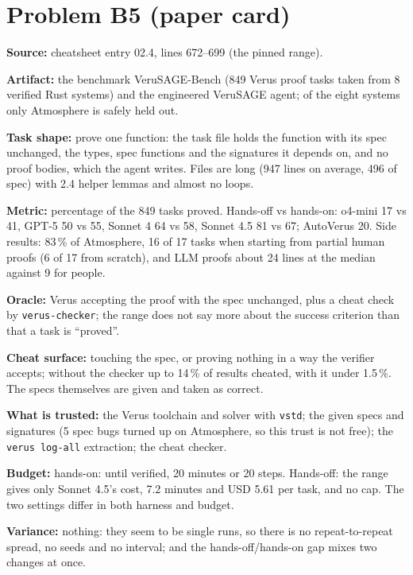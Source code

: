 \documentclass[11pt]{article}
\begin{document}
\section*{Problem B5 (paper card)}\label{ans:B5}
\begin{answer}
\textbf{Source:} cheatsheet entry 02.4, lines 672--699 (the pinned range).

\textbf{Artifact:} the benchmark VeruSAGE-Bench (849 Verus proof tasks taken
from 8 verified Rust systems) and the engineered VeruSAGE agent; of the eight
systems only Atmosphere is safely held out.

\textbf{Task shape:} prove one function: the task file holds the function with
its spec unchanged, the types, spec functions and the signatures it depends on,
and no proof bodies, which the agent writes. Files are long (947 lines on
average, 496 of spec) with 2.4 helper lemmas and almost no loops.

\textbf{Metric:} percentage of the 849 tasks proved. Hands-off vs hands-on:
o4-mini 17 vs 41, GPT-5 50 vs 55, Sonnet 4 64 vs 58, Sonnet 4.5 81 vs 67;
AutoVerus 20. Side results: 83\,\% of Atmosphere, 16 of 17 tasks when starting
from partial human proofs (6 of 17 from scratch), and LLM proofs about 24 lines
at the median against 9 for people.

\textbf{Oracle:} Verus accepting the proof with the spec unchanged, plus a
cheat check by \texttt{verus-checker}; the range does not say more about the
success criterion than that a task is ``proved''.

\textbf{Cheat surface:} touching the spec, or proving nothing in a way the
verifier accepts; without the checker up to 14\,\% of results cheated, with it
under 1.5\,\%. The specs themselves are given and taken as correct.

\textbf{What is trusted:} the Verus toolchain and solver with \texttt{vstd};
the given specs and signatures (5 spec bugs turned up on Atmosphere, so this
trust is not free); the \texttt{verus log-all} extraction; the cheat checker.

\textbf{Budget:} hands-on: until verified, 20 minutes or 20 steps. Hands-off:
the range gives only Sonnet 4.5's cost, 7.2 minutes and USD 5.61 per task, and
no cap. The two settings differ in both harness and budget.

\textbf{Variance:} nothing: they seem to be single runs, so there is no
repeat-to-repeat spread, no seeds and no interval; and the hands-off/hands-on
gap mixes two changes at once.
\end{answer}
\end{document}
